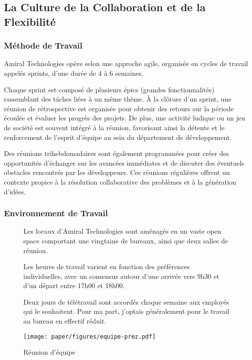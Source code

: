 \subsection*{La Culture de la Collaboration et de la Flexibilité}
\subsubsection{Méthode de Travail}
Amiral Technologies opère selon une approche agile, organisée en cycles de travail appelés sprints, d'une durée de 4 à 6 semaines.

Chaque sprint est composé de plusieurs épics (grandes fonctionnalités) rassemblant des tâches liées à un même thème.
À la clôture d'un sprint, une réunion de rétrospective est organisée pour obtenir des retours sur la période écoulée et évaluer les progrès des projets.
De plus, une activité ludique ou un jeu de société est souvent intégré à la réunion, favorisant ainsi la détente et le renforcement de l'esprit d'équipe au sein du département de développement.

Des réunions trihebdomadaires sont également programmées pour créer des opportunités d'échanger sur les avancées immédiates et de discuter des éventuels obstacles rencontrés par les développeurs.
Ces réunions régulières offrent un contexte propice à la résolution collaborative des problèmes et à la génération d'idées.


\subsubsection{Environnement de Travail}
\begin{figure}[ht!]
    \begin{minipage}[c]{0.475\textwidth}
        Les locaux d'Amiral Technologies sont aménagés en un vaste open space comportant une vingtaine de bureaux, ainsi que deux salles de réunion.
        
        Les heures de travail varient en fonction des préférences individuelles, avec un consensus autour d'une arrivée vers 9h30 et d'un départ entre 17h00 et 18h00.
        
        Deux jours de télétravail sont accordés chaque semaine aux employés qui le souhaitent.
        Pour ma part, j'optais généralement pour le travail au bureau en effectif réduit.
    \end{minipage} %
    \begin{minipage}[c]{0.05\textwidth}
        \hfill
    \end{minipage} %
    \begin{minipage}[c]{0.475\textwidth}
        \centering
        \texttt{[image: paper/figures/equipe-prez.pdf]}
        \caption{Réunion d'équipe}
    \end{minipage}
\end{figure}